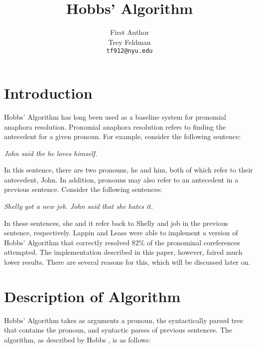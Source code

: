\documentclass[11pt]{article}
\title{Hobbs' Algorithm}
\author{First Author \\
  Trey Feldman \\
  {\tt tf912@nyu.edu} \\}
\date{}
\begin{document}
\maketitle

\section{Introduction}

Hobbs' Algorithm has long been used as a baseline system for pronomial anaphora resolution. Pronomial anaphora resolution refers to finding the antecedent for a given pronoun. For example, consider the following sentence:

\begin{center}
\textit{John said the he loves himself.}
\end{center}

In this sentence, there are two pronouns, he and him, both of which refer to their antecedent, John. In addition, pronouns may also refer to an antecedent in a previous sentence. Consider the following sentences:

\begin{center}
\textit{Shelly got a new job. John said that she hates it.}
\end{center}

In these sentences, she and it refer back to Shelly and job in the previous sentence, respectively. Lappin and Leass  were able to implement a version of Hobbs' Algorithm that correctly resolved 82\% of the pronominal coreferences attempted. The implementation described in this paper, however, faired much lower results. There are several reasons for this, which will be discussed later on.

\section{Description of Algorithm}

Hobbs' Algorithm takes as arguments a pronoun, the syntactically parsed tree that contains the pronoun, and syntactic parses of previous sentences. The algorithm, as described by Hobbs , is as follows:
\end{document}
